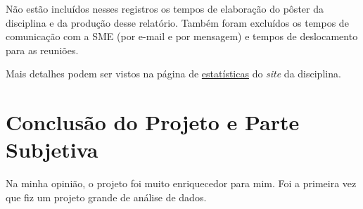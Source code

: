 \documentclass[12pt, a4paper]{article}
\begin{document}
Não estão incluídos nesses registros os tempos de elaboração do pôster da disciplina e da produção desse relatório. Também foram excluídos os tempos de comunicação com a SME (por e-mail e por mensagem) e tempos de deslocamento para as reuniões. 

Mais detalhes podem ser vistos na página de \href{https://lsflp.github.io/MAC0213/estatisticas.html}{estatísticas} do \textit{site} da disciplina.

\section{Conclusão do Projeto e Parte Subjetiva}

Na minha opinião, o projeto foi muito enriquecedor para mim. Foi a primeira vez que fiz um projeto grande de análise de dados. 




\end{document}
